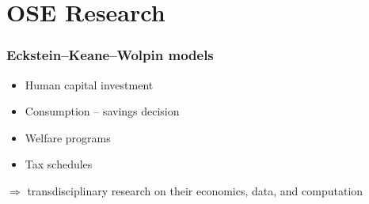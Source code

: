 \section{OSE Research}
\begin{frame}\frametitle{Eckstein--Keane--Wolpin models}



  	  \begin{multicols}{2}
  	    \vspace{0.3cm}
  	    \begin{itemize}\setlength\itemsep{1em}
          \item Human capital investment
          \item Consumption -- savings decision
  	    \end{itemize}

        \pause

  	    \vspace{0.3cm}
  	    \begin{itemize}\setlength\itemsep{1em}
          \item Welfare programs
          \item Tax schedules
  	  \end{itemize}
  	  \end{multicols}
\pause
\hspace{0.3cm}$\Rightarrow$ transdisciplinary research on their \alert<4>{economics}, \alert<5>{data}, and \alert<6>{computation}

\end{frame}
